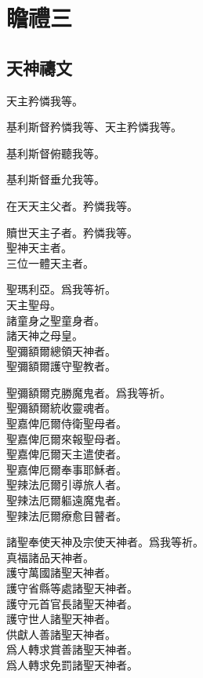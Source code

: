 \chapter[瞻禮三]{瞻禮三}
\section{天神禱文}
\versicle 天主矜憐我等。

\Response 基利斯督矜憐我等、天主矜憐我等。

\versicle 基利斯督俯聽我等。

\Response 基利斯督垂允我等。

\versicle 在天天主父者。\hfill \response 矜憐我等。

\versicle 贖世天主子者。\hfill \response 矜憐我等。\\
聖神天主者。\\
三位一體天主者。

\versicle 聖瑪利亞。\hfill \response 爲我等祈。\\
天主聖母。\\
諸童身之聖童身者。\\
諸天神之母皇。\\
聖彌額爾總領天神者。\\
聖彌額爾護守聖教者。

\versicle 聖彌額爾克勝魔鬼者。\hfill \response 爲我等祈。\\
聖彌額爾統收靈魂者。\\
聖嘉俾厄爾侍衛聖母者。\\
聖嘉俾厄爾來報聖母者。\\
聖嘉俾厄爾天主遣使者。\\
聖嘉俾厄爾奉事耶穌者。\\
聖辣法厄爾引導旅人者。\\
聖辣法厄爾軀遠魔鬼者。\\
聖辣法厄爾療愈目瞽者。

\versicle 諸聖奉使天神及宗使天神者。\hfill \response 爲我等祈。\\
真福諸品天神者。\\
護守萬國諸聖天神者。\\
護守省縣等處諸聖天神者。\\
護守元首官長諸聖天神者。\\
護守世人諸聖天神者。\\
供獻人善諸聖天神者。\\
爲人轉求賞善諸聖天神者。\\
爲人轉求免罰諸聖天神者。

